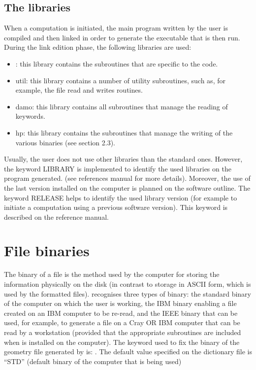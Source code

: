 \subsection{The libraries}
When a computation is initiated, the main program written by the user is
compiled and then linked in order to generate the executable that is then run.
During the link edition phase, the following libraries are used:
\begin{itemize}
\item \stbtel: this library contains the subroutines that are specific to the
\stbtel code.
\item util: this library contains a number of utility subroutines, such as, for
example, the file read and writes routines.
\item damo: this library contains all subroutines that manage the reading of
keywords.
\item hp: this library contains the subroutines that manage the writing of the
various binaries (see section 2.3).
\end{itemize}
Usually, the user does not use other libraries than the standard ones. However,
the keyword LIBRARY is implemented to identify the used libraries on the
program generated. (see references manual for more details).
Moreover, the use of the last version installed on the computer is planned on
the software outline. The keyword RELEASE helps to identify the used library
version (for example to initiate a computation using a previous software
version). This keyword is described on the reference manual.
\section{File binaries}
The binary of a file is the method used by the computer for storing the
information physically on the disk (in contrast to storage in ASCII form, which
is used by the formatted files). \stbtel recognises three types of binary: the
standard binary of the computer on which the user is working, the IBM binary
enabling a file created on an IBM computer to be re-read, and the IEEE binary
that can be used, for example, to generate a file on a Cray OR IBM computer
that can be read by a workstation (provided that the appropriate subroutines
are included when \stbtel is installed on the computer).
The keyword used to fix the binary of the geometry file generated by \stbtel
is: .
The default value specified on the dictionary file is “STD” (default binary of
the computer that is being used)


